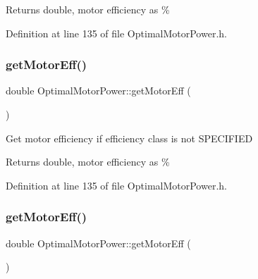 \begin{DoxyReturn}{Returns}
double, motor efficiency as \% 
\end{DoxyReturn}


Definition at line 135 of file Optimal\+Motor\+Power.\+h.

\mbox{\label{class_optimal_motor_power_a341fe7520227f27f9cce23f3dc4cb0cb}} 
\subsubsection{\texorpdfstring{get\+Motor\+Eff()}{getMotorEff()}\hspace{0.1cm}{\footnotesize\ttfamily [2/3]}}
{\footnotesize\ttfamily double Optimal\+Motor\+Power\+::get\+Motor\+Eff (\begin{DoxyParamCaption}{ }\end{DoxyParamCaption})\hspace{0.3cm}{\ttfamily [inline]}}

Get motor efficiency if efficiency class is not S\+P\+E\+C\+I\+F\+I\+ED

\begin{DoxyReturn}{Returns}
double, motor efficiency as \% 
\end{DoxyReturn}


Definition at line 135 of file Optimal\+Motor\+Power.\+h.

\mbox{\label{class_optimal_motor_power_a341fe7520227f27f9cce23f3dc4cb0cb}} 
\subsubsection{\texorpdfstring{get\+Motor\+Eff()}{getMotorEff()}\hspace{0.1cm}{\footnotesize\ttfamily [3/3]}}
{\footnotesize\ttfamily double Optimal\+Motor\+Power\+::get\+Motor\+Eff (\begin{DoxyParamCaption}{ }\end{DoxyParamCaption})\hspace{0.3cm}{\ttfamily [inline]}}

